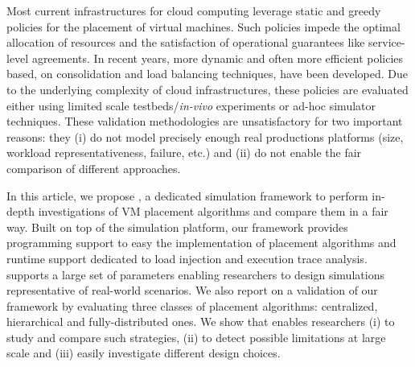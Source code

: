 Most current infrastructures for cloud computing leverage static and
greedy policies for the placement of virtual machines. Such policies
impede the optimal allocation of resources and the satisfaction of
operational guarantees like service-level agreements. In recent years,
more dynamic and often more efficient policies based, \eg on
consolidation and load balancing techniques, have been developed. Due
to the underlying complexity of cloud infrastructures, these policies
are evaluated either using limited scale testbeds/\emph{in-vivo}
experiments or ad-hoc simulator techniques. These validation
methodologies are unsatisfactory for two important reasons: they (i)
do not model precisely enough real productions platforms (size,
workload representativeness, failure, etc.) and (ii) do not enable the
fair comparison of different approaches.

In this article, we propose \vmps, a dedicated simulation framework to
perform in-depth investigations of VM placement algorithms and compare
them in a fair way. Built on top of the \sg simulation platform, our
framework provides programming support to easy the implementation of
placement algorithms and runtime support dedicated to load injection
and execution trace analysis. \vmps supports a large set of parameters
enabling researchers to design simulations representative of
real-world scenarios. We also report on a validation of our framework
by evaluating three classes of placement algorithms: centralized,
hierarchical and fully-distributed ones. We show that \vmps enables
researchers (i) to study and compare such strategies, (ii) to detect
possible limitations at large scale and (iii) easily investigate
different design choices.
